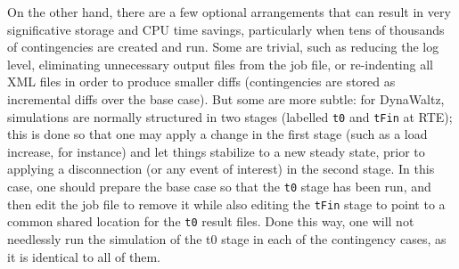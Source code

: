 \documentclass[conference]{IEEEtran}
\newcommand{\code}[1]{\texttt{#1}}
\begin{document}
On the other hand, there are a few optional arrangements that can result in very
significative storage and CPU time savings, particularly when tens of thousands
of contingencies are created and run.  Some are trivial, such as reducing the
log level, eliminating unnecessary output files from the job file, or
re-indenting all XML files in order to produce smaller diffs (contingencies are
stored as incremental diffs over the base case). But some are more subtle: for
DynaWaltz, simulations are normally structured in two stages (labelled \code{t0}
and \code{tFin} at RTE); this is done so that one may apply a change in the
first stage (such as a load increase, for instance) and let things stabilize to
a new steady state, prior to applying a disconnection (or any event of interest)
in the second stage.  In this case, one should prepare the base case so that the
\code{t0} stage has been run, and then edit the job file to remove it while also
editing the \code{tFin} stage to point to a common shared location for the
\code{t0} result files. Done this way, one will not needlessly run the
simulation of the t0 stage in each of the contingency cases, as it is identical
to all of them.
\end{document}
